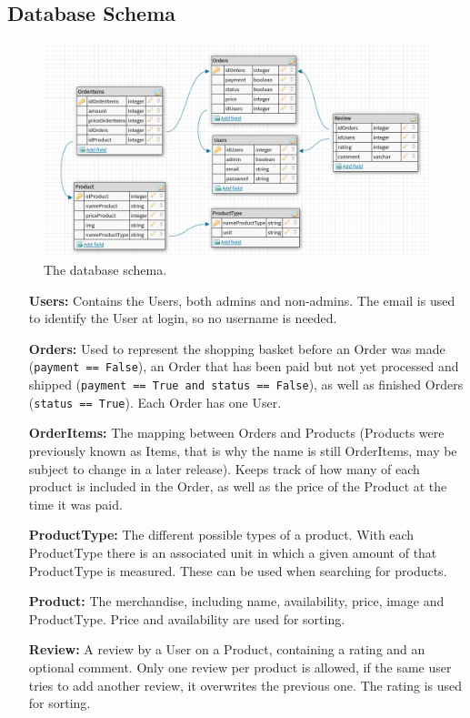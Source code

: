 \newpage

\subsection{Database Schema}

\begin{figure}[H]
  \centering
  \includegraphics[width=\textwidth]{third_sprint/db_schema.png}
  \caption{\label{fig:schema} The database schema.}
\end{figure}

\begin{itemize}
  \item[\textbf{Users:}] Contains the Users, both admins and non-admins. The
    email is used to identify the User at login, so no username is needed.
  \item[\textbf{Orders:}] Used to represent the shopping basket before an
    Order was made \\(\texttt{payment == False}), an Order that has
    been paid but not yet processed and shipped (\texttt{payment == True and status == False}), as well as finished Orders
    (\texttt{status == True}). Each Order has one User.
  \item[\textbf{OrderItems:}] The mapping between Orders and Products
    (Products were previously known as Items, that is why the name is still
    OrderItems, may be subject to change in a later release). Keeps track
    of how many of each product is included in the Order, as well as the
    price of the Product at the time it was paid.
  \item[\textbf{ProductType:}] The different possible types of a product. With
    each ProductType there is an associated unit in which a given amount
    of that ProductType is measured. These can be used when searching for
    products.
  \item[\textbf{Product:}] The merchandise, including name, availability,
  price, image and ProductType. Price and availability are used for sorting.
  \item[\textbf{Review:}] A review by a User on a Product, containing a rating
    and an optional comment. Only one review per product is allowed, if the
    same user tries to add another review, it overwrites the previous one. The
    rating is used for sorting.
\end{itemize}

